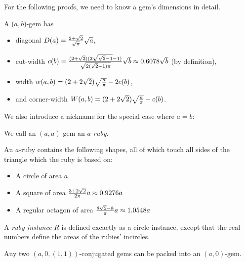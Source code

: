 \documentclass[a4paper,style=print,bibliography=totoc,nexus,lnum,extramargin]{tubsbook}
\begin{document}

For the following proofs, we need to know a gem's dimensions in detail.

\begin{lemma}\label{th:gem-size}
    A ($a,b$)-gem has
    \begin{itemize}
        \item diagonal $D(a) = \frac{2+\sqrt{2}}{\sqrt{\pi}}\sqrt{a}$,
        \item cut-width $c(b) = \frac{(2+\sqrt{2})(2\sqrt{\sqrt{2}-1}-1)}{\sqrt{2(\sqrt{2}-1)\pi}}\sqrt{b} \approx 0.6078 \sqrt{b}$ (by definition),
        \item width $w(a,b) = (2+2\sqrt{2})\sqrt{\frac{a}{\pi}} - 2c(b)$,
        \item and corner-width $W(a,b) = (2+2\sqrt{2})\sqrt{\frac{a}{\pi}} - c(b)$.
    \end{itemize}
\end{lemma}


We also introduce a nickname for the special case where $a=b$:

\begin{definition}
    We call an $(a,a)$-gem an \emph{$a$-ruby}.
\end{definition}


An $a$-ruby contains the following shapes, all of which touch all sides of the triangle which the ruby is based on:

\begin{itemize}
    \item A circle of area $a$
    \item A square of area $\frac{3+2\sqrt{2}}{2\pi}a \approx 0.9276a$
    \item A regular octagon of area $\frac{8\sqrt{2}-8}{\pi}a \approx 1.0548a$
\end{itemize}

\begin{definition}
    A \emph{ruby instance} $R$ is defined excactly as a circle instance, except that the real numbers define the areas of the rubies' incircles.
\end{definition}

\begin{theorem}
    Any two $(a, 0, (1,1))$-conjugated gems can be packed into an $(a,0)$-gem.
\end{theorem}
\end{document}
